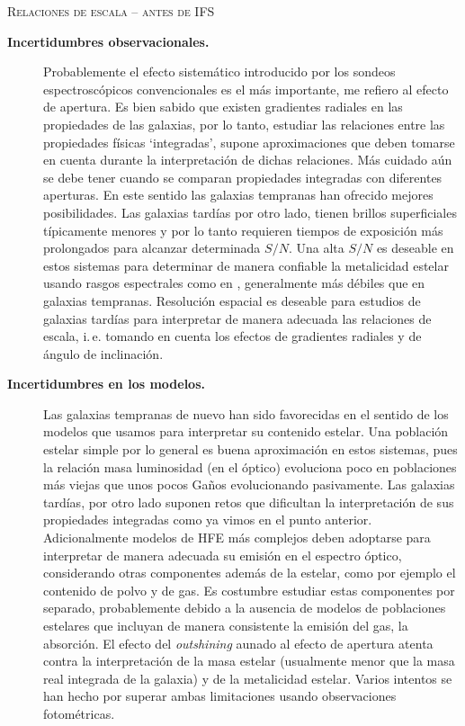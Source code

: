 \documentclass[xcolor=dvipsnames,4pt,hyperref={colorlinks,citecolor=black,linkcolor=black,urlcolor=black}]{beamer}
\begin{document}
\begin{frame}[allowframebreaks]{\textsc{Relaciones de escala -- antes de IFS}}
\begin{description}
%
\item[\textbf{Incertidumbres observacionales.}] Probablemente el efecto sistemático introducido por
los sondeos espectroscópicos convencionales es el más importante, me refiero al efecto de apertura.
Es bien sabido que existen gradientes radiales en las propiedades de las galaxias, por lo tanto,
estudiar las relaciones entre las propiedades físicas `integradas', supone aproximaciones que deben
tomarse en cuenta durante la interpretación de dichas relaciones. Más cuidado aún se debe tener
cuando se comparan propiedades integradas con diferentes aperturas. En este sentido las galaxias
tempranas han ofrecido mejores posibilidades. Las galaxias tardías por otro lado, tienen brillos
superficiales típicamente menores y por lo tanto requieren tiempos de exposición más prolongados
para alcanzar determinada $S/N$. Una alta $S/N$ es deseable en estos sistemas para determinar de
manera confiable la metalicidad estelar usando rasgos espectrales como en \citet{Gallazzi2005},
generalmente más débiles que en galaxias tempranas. Resolución espacial es deseable para estudios de
galaxias tardías para interpretar de manera adecuada las relaciones de escala, i.\,e. tomando en
cuenta los efectos de gradientes radiales y de ángulo de inclinación.
%
\item[\textbf{Incertidumbres en los modelos.}] Las galaxias tempranas de nuevo han sido favorecidas
en el sentido de los modelos que usamos para interpretar su contenido estelar. Una población estelar
simple por lo general es buena aproximación en estos sistemas, pues la relación masa luminosidad (en
el óptico) evoluciona poco en poblaciones más viejas que unos pocos Gaños evolucionando pasivamente.
Las galaxias tardías, por otro lado suponen retos que dificultan la interpretación de sus
propiedades integradas como ya vimos en el punto anterior. Adicionalmente modelos de HFE más
complejos deben adoptarse para interpretar de manera adecuada su emisión en el espectro óptico,
considerando otras componentes además de la estelar, como por ejemplo el contenido de polvo y de
gas. Es costumbre estudiar estas componentes por separado, probablemente debido a la ausencia de
modelos de poblaciones estelares que incluyan de manera consistente la emisión del gas, la
absorción. El efecto del \emph{outshining} aunado al efecto de apertura atenta contra la
interpretación de la masa estelar (usualmente menor que la masa real integrada de la galaxia) y de
la metalicidad estelar. Varios intentos se han hecho por superar ambas limitaciones usando
observaciones fotométricas. 
%
\end{description}

%
\end{frame}
\end{document}
